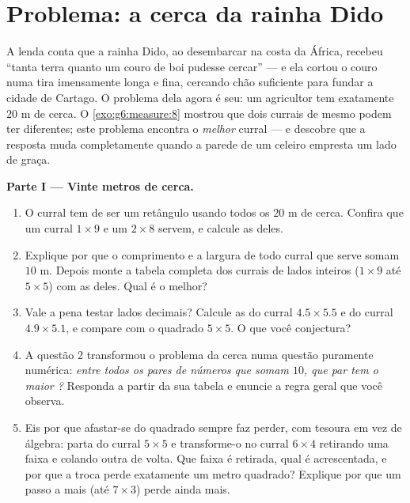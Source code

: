\section{Problema: a cerca da rainha Dido}

\begin{problem}
\label{pb:g6:measure:1}
A lenda conta que a rainha Dido, ao desembarcar na costa da África,
recebeu ``tanta terra quanto um couro de boi pudesse cercar'' --- e ela
cortou o couro numa tira imensamente longa e fina, cercando chão
suficiente para fundar a cidade de Cartago. O problema dela agora é
seu: um agricultor tem exatamente $20$ m de cerca. O
\cref{exo:g6:measure:8} mostrou que dois currais de mesmo 
podem ter  diferentes; este problema encontra o \emph{melhor}
curral --- e descobre que a resposta muda completamente quando a parede
de um celeiro empresta um lado de graça.

\medskip
\noindent\textbf{Parte I --- Vinte metros de cerca.}
\begin{enumerate}
  \item O curral tem de ser um retângulo usando todos os $20$ m de
        cerca. Confira que um curral $1 \times 9$ e um $2 \times 8$
        servem, e calcule as  deles.
  \item Explique por que o comprimento e a largura de todo curral que
        serve somam $10$ m. Depois monte a tabela completa dos currais
        de lados inteiros ($1 \times 9$ até $5 \times 5$) com as 
        deles. Qual é o melhor?
  \item Vale a pena testar lados decimais? Calcule as  do curral
        $4.5 \times 5.5$ e do curral $4.9 \times 5.1$, e compare com o
        quadrado $5 \times 5$. O que você conjectura?
  \item A questão 2 transformou o problema da cerca numa questão
        puramente numérica: \emph{entre todos os pares de números que
        somam $10$, que par tem o maior ?} Responda a partir da
        sua tabela e enuncie a regra geral que você observa.
  \item Eis por que afastar-se do quadrado sempre faz perder, com
        tesoura em vez de álgebra: parta do curral $5 \times 5$ e
        transforme-o no curral $6 \times 4$ retirando uma faixa e
        colando outra de volta. Que faixa é retirada, qual é
        acrescentada, e por que a troca perde exatamente um metro
        quadrado? Explique por que um passo a mais (até $7 \times 3$)
        perde ainda mais.
\end{enumerate}


\end{problem}
